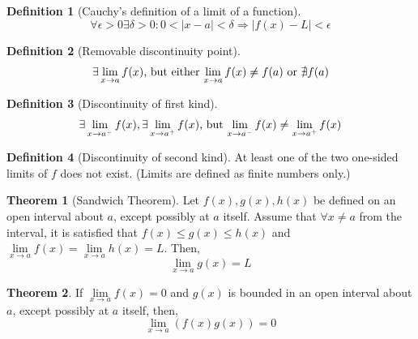 \documentclass[fleqn, a4paper, 10pt]{article}
\theoremstyle{definition}
\newtheorem{definition}{Definition}
\theoremstyle{theorem}
\newtheorem{theorem}{Theorem}
\theoremstyle{remark}
\begin{document}
\begin{multicols}{2}
\begin{definition}[Cauchy's definition of a limit of a function]
	\begin{equation*}
	\forall \epsilon > 0 \exists \delta > 0 : 0 < |x - a| < \delta \Rightarrow |f(x) - L| < \epsilon
	\end{equation*}
\end{definition}

\begin{definition}[Removable discontinuity point]
	\begin{equation*}
		\exists \lim\limits_{x \rightarrow a} f(x)$, but either $\lim\limits_{x \rightarrow a} f(x) \neq f(a)$ or $\nexists f(a)
	\end{equation*}
\end{definition}

\begin{definition}[Discontinuity of first kind]
	\begin{equation*}
		\exists \lim\limits_{x \rightarrow a^-} f(x), \exists \lim\limits_{x \rightarrow a^+} f(x)$, but $\lim\limits_{x \rightarrow a^-} f(x) \neq \lim\limits_{x \rightarrow a^+} f(x)
	\end{equation*}
\end{definition}

\begin{definition}[Discontinuity of second kind]
	At least one of the two one-sided limits of $f$ does not exist. (Limits are defined as finite numbers only.)
\end{definition}

\begin{theorem}[Sandwich Theorem] \label{Sandwich Theorem}
	Let $f(x), g(x), h(x)$ be defined on an open interval about $a$, except possibly at $a$ itself. Assume that $\forall x \neq a$ from the interval, it is satisfied that $f(x) \leq g(x) \leq h(x)$ and $\lim\limits_{x \rightarrow a} f(x) = \lim\limits_{x \rightarrow a} h(x) = L$. Then, 
	\begin{equation*}
		\lim\limits_{x \rightarrow a} g(x) = L
	\end{equation*}
\end{theorem}

\begin{theorem}
	If $\lim\limits_{x \rightarrow a} f(x) = 0$ and $g(x)$ is bounded in an open interval about $a$, except possibly at $a$ itself, then, 
	\begin{equation*}
		\lim\limits_{x \rightarrow a}(f(x)g(x)) = 0
	\end{equation*}
\end{theorem}


\end{multicols}
\end{document}
